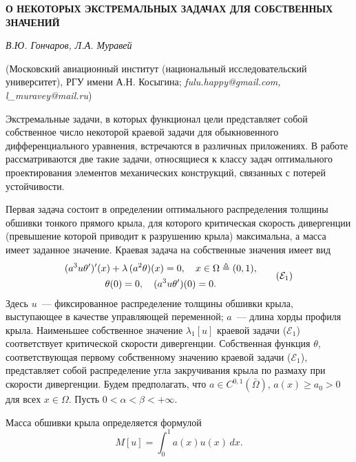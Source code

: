 

\begin{center}
    {\bf О НЕКОТОРЫХ ЭКСТРЕМАЛЬНЫХ ЗАДАЧАХ ДЛЯ СОБСТВЕННЫХ ЗНАЧЕНИЙ}

    {\it В.Ю. Гончаров, Л.А. Муравей }
	
    (Московский авиационный институт (национальный исследовательский университет), РГУ имени А.Н. Косыгина; {\it fulu.happy@gmail.com, l\_muravey@mail.ru})
	
\end{center}




\par
Экстремальные задачи, в которых функционал цели
\linebreak
представляет
собой собственное число
некоторой краевой задачи для обыкновенного дифференциального уравнения,
встречаются в различных приложениях.
%
%
%
В работе рассматриваются две такие задачи, относящиеся к классу задач оптимального проектирования
элементов механических конструкций, связанных с потерей устойчивости.
%
%
%
%
%
\par
Первая задача состоит в определении оптимального распределения толщины обшивки тонкого прямого
крыла,
для которого критическая скорость дивергенции
(превышение которой приводит к разрушению крыла)
максимальна, а масса имеет заданное значение.
%
%
%
Краевая задача на собственные значения имеет вид
\[
\begin{gathered}
(a^3 u \theta')'(x) + \lambda \, (a^2 \theta)(x) = 0,
\quad
x \in \Omega \triangleq (0, 1),
\\
\theta(0) = 0,
\quad
(a^3 u \theta')(0) = 0.
\end{gathered}
\tag{$\mathcal{E}_1$}
\]
Здесь
$u$~--- фиксированное распределение толщины обшивки крыла,
выступающее в качестве управляющей переменной;
$a$~--- длина хорды профиля крыла.
%
%
%
Наименьшее собственное значение $\lambda_1[u]$ краевой задачи
($\mathcal{E}_1$)
соответствует критической
скорости дивергенции.
%
%
%
Собственная функция $\theta$,
соответствующая первому собственному
значению краевой задачи
($\mathcal{E}_1$),
представляет собой распределение угла закручивания крыла по
размаху при скорости дивергенции.
%
%
%
Будем предполагать,
что
$a \in C^{0, 1}(\bar{\Omega})$, $a(x) \geq a_0 > 0$ для всех $x \in \Omega$.
%
%
%
Пусть
$0 < \alpha < \beta < +\infty$.
%
%
%
%
%
\par
Масса обшивки крыла определяется формулой
\[
M[u] = \int_0^1 a(x) u(x) \, dx.
\]
